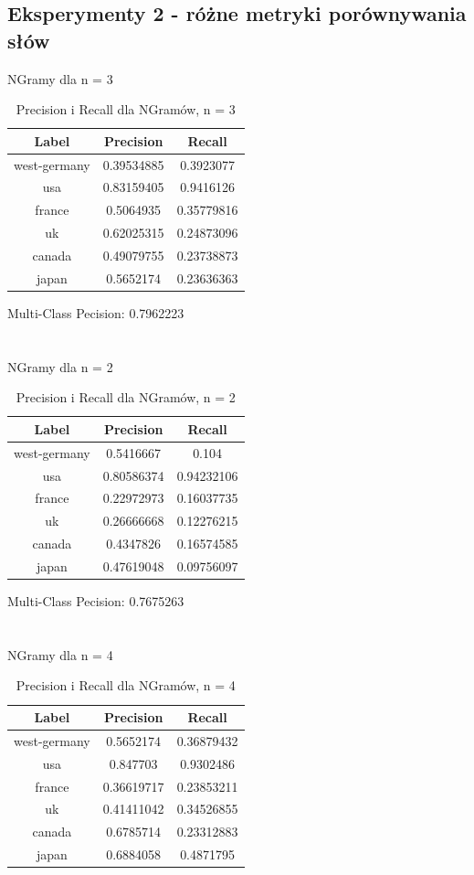 \documentclass{classrep}
\begin{document}
\subsection{Eksperymenty 2 - różne metryki porównywania słów}
NGramy dla n = 3
\begin{table}[H]
\begin{tabular}{|c|c|c|}
\hline
Label        & Precision  & Recall     \\ \hline
west-germany & 0.39534885 & 0.3923077  \\ \hline
usa          & 0.83159405 & 0.9416126  \\ \hline
france       & 0.5064935  & 0.35779816 \\ \hline
uk           & 0.62025315 & 0.24873096 \\ \hline
canada       & 0.49079755 & 0.23738873 \\ \hline
japan        & 0.5652174  & 0.23636363 \\ \hline
\end{tabular}
\caption{Precision i Recall dla NGramów, n = 3}
\end{table}
Multi-Class Pecision: 0.7962223\\
\\
\\
NGramy dla n = 2
\begin{table}[H]
\begin{tabular}{|c|c|c|}
\hline
Label        & Precision  & Recall     \\ \hline
west-germany & 0.5416667  & 0.104      \\ \hline
usa          & 0.80586374 & 0.94232106 \\ \hline
france       & 0.22972973 & 0.16037735 \\ \hline
uk           & 0.26666668 & 0.12276215 \\ \hline
canada       & 0.4347826  & 0.16574585 \\ \hline
japan        & 0.47619048 & 0.09756097 \\ \hline
\end{tabular}
\caption{Precision i Recall dla NGramów, n = 2}
\end{table}
Multi-Class Pecision: 0.7675263\\
\\
\\
NGramy dla n = 4
\begin{table}[H]
\begin{tabular}{|c|c|c|}
\hline
Label        & Precision  & Recall     \\ \hline
west-germany & 0.5652174  & 0.36879432 \\ \hline
usa          & 0.847703   & 0.9302486  \\ \hline
france       & 0.36619717 & 0.23853211 \\ \hline
uk           & 0.41411042 & 0.34526855 \\ \hline
canada       & 0.6785714  & 0.23312883 \\ \hline
japan        & 0.6884058  & 0.4871795  \\ \hline
\end{tabular}
\caption{Precision i Recall dla NGramów, n = 4}
\end{table}
\end{document}

